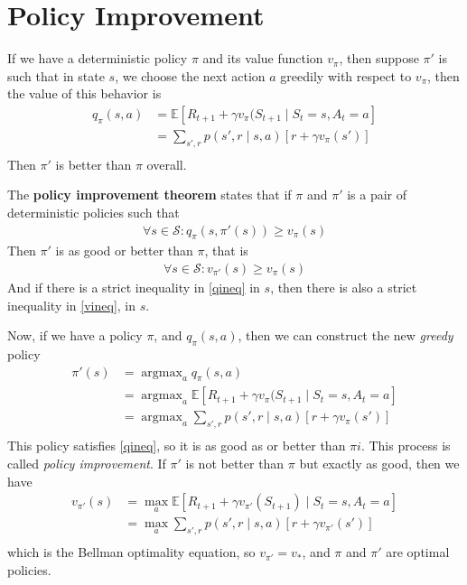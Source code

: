 \documentclass[a4paper,11pt,reqno]{amsart}
\begin{document}
\section*{Policy Improvement}
If we have a deterministic policy $\pi $ and its value function $v_{\pi }$, then suppose $\pi '$ is such that in state $s$, we choose the next action $a$ greedily with respect to $v_{\pi }$, then the value of this behavior is
\begin{align}
q_{\pi }(s, a) &= \mathbb{E}\left[ R_{t+1} + \gamma v_{\pi }(S_{t+1} \mid S_{t}=s, A_t = a \right]  \\
&= \sum_{s', r} p(s', r \mid s, a) \left[ r + \gamma v_{\pi }(s') \right]  \\
\end{align}
Then $\pi '$ is better than $\pi $ overall.

The \textbf{policy improvement theorem} states that if $\pi $ and $\pi '$ is a pair of deterministic policies such that
\begin{align}
    \forall s \in \mathcal{S}: q_{\pi }(s, \pi '(s)) \ge v_{\pi }(s) \label{qineq}
\end{align}
Then $\pi '$ is as good or better than $\pi $, that is
\begin{align}
    \forall s \in \mathcal{S}: v_{\pi '}(s) \ge v_{\pi }(s) \label{vineq}
\end{align}
And if there is a strict inequality in \eqref{qineq} in $s$, then there is also a strict inequality in \eqref{vineq}, in $s$. 

Now, if we have a policy $\pi $, and $q_{\pi }(s, a)$, then we can construct the new \emph{greedy} policy
\begin{align}
\pi '(s) &= \operatorname{argmax}_{a}q_{\pi }(s, a) \\
&= \operatorname{argmax}_{a}\mathbb{E}\left[ R_{t+1} + \gamma v_{\pi }(S_{t+1} \mid S_{t}=s, A_t =a \right]  \\
&= \operatorname{argmax}_{a}\sum_{s', r} p(s', r \mid s, a) \left[ r + \gamma v_{\pi }(s') \right]  \\
\end{align}
This policy satisfies \eqref{qineq}, so it is as good as or better than $\pi i$. This process is called \emph{policy improvement}. If $\pi '$ is not better than $\pi $ but exactly as good, then we have
\begin{align}
v_{\pi '}(s) &= \max_a \mathbb{E}\left[ R_{t+1} + \gamma v_{\pi '}(S_{t+1}) \mid S_{t}=s, A_t = a \right] \\
&= \max_a \sum_{s', r} p(s', r \mid s, a) \left[ r + \gamma v_{\pi '}(s') \right]  \\
\end{align}
which is the Bellman optimality equation, so $v_{\pi '}=v_{*}$, and $\pi $ and $\pi '$ are optimal policies. 
\end{document}
